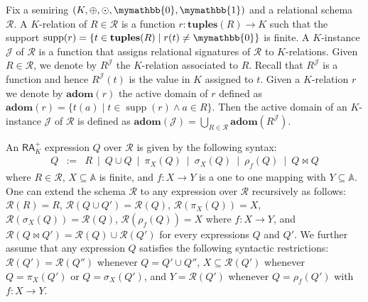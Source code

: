 \documentclass[sigconf]{acmart}
\newcommand{\att}{\mathbb{A}}
\newcommand{\tuples}{\mathbf{tuples}}
\newcommand{\supp}{\operatorname{supp}}
\newcommand{\cJ}{\mathcal{J}}
\newcommand{\cR}{\mathcal{R}}
\newcommand{\adom}{\mathbf{adom}}
\newcommand{\ksum}{\oplus}
\newcommand{\kprod}{\odot}
\newcommand{\kzero}{\mymathbb{0}}
\newcommand{\kone}{\mymathbb{1}}
\newcommand{\arae}{Q}
\begin{document}
Fix a semiring $(K, \ksum, \kprod, \kzero, \kone)$ and a relational schema $\cR$. A $K$-relation of $R \in \cR$ is a function $r: \tuples(R) \rightarrow K$ such that the support  $\supp(r) = \{t \in \tuples(R) \mid r(t) \neq \kzero\}$ is finite. 
A $K$-instance $\cJ$ of $\cR$ is a function that assigns relational signatures of $\cR$ to $K$-relations. Given $R \in \cR$, we denote by $R^\cJ$ the $K$-relation associated to $R$. Recall that $R^\cJ$ is a function and hence  $R^\cJ(t)$ is the value in $K$ assigned to $t$. 
Given a $K$-relation $r$ we denote by $\adom(r)$ the active domain of $r$ defined as $\adom(r) = \{t(a) \mid t \in \supp(r) \wedge a \in R\}$.
Then the active domain of an $K$-instance $\cJ$ of $\cR$ is defined as $\adom(\cJ) = \bigcup_{R \in \cR} \adom(R^\cJ)$. 

An $\mathsf{RA}_{K}^+$  expression $\arae$ over $\cR$ is given by the following syntax:
$$
\begin{array}{rcl}
\arae & := & R \ \mid \ \arae \cup \arae \ \mid \  \pi_X(\arae) \ \mid \  \sigma_X(\arae) \ \mid \ \rho_f(\arae) \ \mid \ \arae \bowtie \arae
\end{array}
$$
where $R \in \cR$, $X \subseteq \att$ is finite, and $f: X \rightarrow Y$ is a one to one mapping with $Y \subseteq \att$. One can extend the schema $\cR$ to any expression over $\cR$ recursively as follows: $\cR(R) = R$, $\cR(\arae \cup \arae') = \cR(\arae)$, $\cR(\pi_X(\arae)) = X$, $\cR(\sigma_X(\arae)) = \cR(\arae)$, $\cR(\rho_f(\arae)) = X$ where $f:X \rightarrow Y$, and $\cR(\arae \bowtie \arae') = \cR(\arae) \cup \cR(\arae')$ for every expressions $\arae$ and $\arae'$.
We further assume that any expression $\arae$ satisfies the following syntactic restrictions: $\cR(\arae') = \cR(\arae'')$ whenever $\arae = \arae' \cup \arae''$, $X \subseteq \cR(\arae')$ whenever $\arae = \pi_X(\arae')$ or $\arae = \sigma_X(\arae')$, and $Y = \cR(\arae')$ whenever $\arae = \rho_f(\arae')$ with $f: X \rightarrow Y$.
\end{document}
